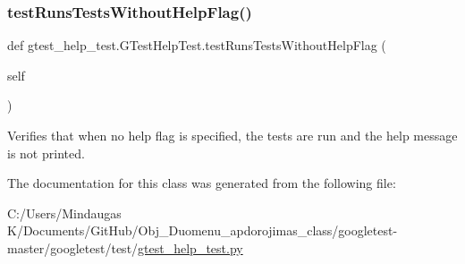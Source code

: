 \subsubsection{\texorpdfstring{testRunsTestsWithoutHelpFlag()}{testRunsTestsWithoutHelpFlag()}}
{\footnotesize\ttfamily def gtest\+\_\+help\+\_\+test.\+G\+Test\+Help\+Test.\+test\+Runs\+Tests\+Without\+Help\+Flag (\begin{DoxyParamCaption}\item[{}]{self }\end{DoxyParamCaption})}

\begin{DoxyVerb}Verifies that when no help flag is specified, the tests are run
and the help message is not printed.\end{DoxyVerb}
 

The documentation for this class was generated from the following file\+:\begin{DoxyCompactItemize}
\item 
C\+:/\+Users/\+Mindaugas K/\+Documents/\+Git\+Hub/\+Obj\+\_\+\+Duomenu\+\_\+apdorojimas\+\_\+class/googletest-\/master/googletest/test/\mbox{\hyperlink{googletest-master_2googletest_2test_2gtest__help__test_8py}{gtest\+\_\+help\+\_\+test.\+py}}\end{DoxyCompactItemize}
